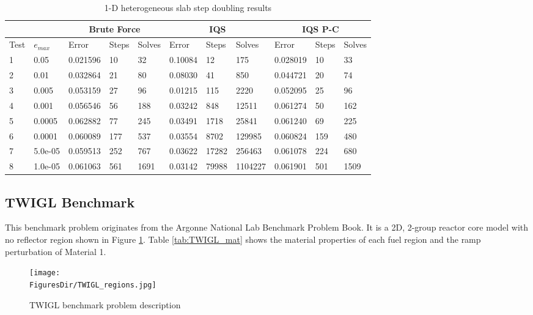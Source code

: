 \documentclass[12pt]{scrartcl}
\newcommand{\FiguresDir}{./figs}
\begin{document}
\begin{table}[!htbp]
\begin{center}
\caption{1-D heterogeneous slab step doubling results}
\label{tab:1Ddt2}
\begin{tabular}{|l|l|l|l|l|l|l|l|l|l|l|}
\hline
  &  & \multicolumn{3}{|c|}{Brute Force} & \multicolumn{3}{|c|}{IQS} & \multicolumn{3}{|c|}{IQS P-C} \\
\hline
Test & $e_{max}$ & Error & Steps & Solves & Error & Steps & Solves & Error & Steps & Solves \\
\hline
1 &	0.05 	&	0.021596 &	10  &	32	 &	0.10084 &	12	  &	175		&	0.028019 &	10	&	33 \\
2 &	0.01 	&	0.032864 &	21  &	80	 &	0.08030 &	41	  &	850	 	&	0.044721 &	20	&	74 \\
3 &	0.005 	&	0.053159 &	27  &	96	 &	0.01215 &	115	  &	2220 	&	0.052095 &	25	&	96 \\
4 & 0.001 	&	0.056546 &	56  &	188	 &	0.03242 &	848	  &	12511 	&	0.061274 &	50	&	162 \\
5 &	0.0005 	&	0.062882 &	77  &	245	 &	0.03491 &	1718  &	25841 	&	0.061240 &	69	&	225 \\
6 &	0.0001 	&	0.060089 &	177 &	537	 &	0.03554 &	8702  &	129985 	&	0.060824 &	159	&	480 \\
7 &	5.0e-05	&	0.059513 &	252 &	767	 &	0.03622 &	17282 &	256463 	&	0.061078 &	224	&	680 \\
8 &	1.0e-05	&	0.061063 &	561 &	1691 &	0.03142 &	79988 &	1104227 &	0.061901 &	501	&	1509 \\
\hline
\end{tabular}
\end{center}
\end{table}

\subsection{TWIGL Benchmark}

This benchmark problem originates from the Argonne National Lab Benchmark Problem Book.  It is a 2D, 2-group reactor core model with no reflector region shown in Figure \ref{fig:TWIGL_reg}.  Table \ref{tab:TWIGL_mat} shows the material properties of each fuel region and the ramp perturbation of Material 1.

\begin{figure}[!htbp]
\begin{center}
\texttt{[image: \\FiguresDir/TWIGL\_regions.jpg]}
\caption{TWIGL benchmark problem description}
\label{fig:TWIGL_reg}
\end{center}
\end{figure}
\end{document}
